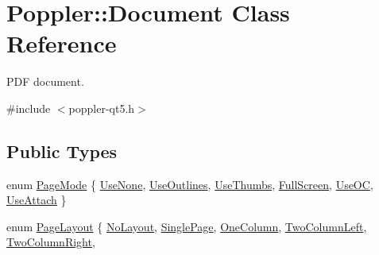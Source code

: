 \hypertarget{class_poppler_1_1_document}{}\section{Poppler\+:\+:Document Class Reference}
\label{class_poppler_1_1_document}


P\+DF document.  




{\ttfamily \#include $<$poppler-\/qt5.\+h$>$}

\subsection*{Public Types}
\begin{DoxyCompactItemize}
\item 
enum \hyperlink{class_poppler_1_1_document_a7157091ddc85f62b02cfc35a08c4822b}{Page\+Mode} \{ \newline
\hyperlink{class_poppler_1_1_document_a7157091ddc85f62b02cfc35a08c4822ba4b709ee334e2c3ea2bd8df2680de501e}{Use\+None}, 
\hyperlink{class_poppler_1_1_document_a7157091ddc85f62b02cfc35a08c4822ba0a1bf7b447a3f36898f6c5b286f53b21}{Use\+Outlines}, 
\hyperlink{class_poppler_1_1_document_a7157091ddc85f62b02cfc35a08c4822ba5984e71380eaffa41b4a90bb9c4a965b}{Use\+Thumbs}, 
\hyperlink{class_poppler_1_1_document_a7157091ddc85f62b02cfc35a08c4822ba942ce16a97060ae7ebe6513d9a860cd7}{Full\+Screen}, 
\newline
\hyperlink{class_poppler_1_1_document_a7157091ddc85f62b02cfc35a08c4822bae61492f6fb35469e734e8f41a292c4e9}{Use\+OC}, 
\hyperlink{class_poppler_1_1_document_a7157091ddc85f62b02cfc35a08c4822ba382b116328e14edd5929cfcc28c69f04}{Use\+Attach}
 \}
\item 
enum \hyperlink{class_poppler_1_1_document_a27b1574f15e09ae08b7acf7cc98f3fbd}{Page\+Layout} \{ \newline
\hyperlink{class_poppler_1_1_document_a27b1574f15e09ae08b7acf7cc98f3fbda711c5286c04de74232bc6a2ca4a4a05d}{No\+Layout}, 
\hyperlink{class_poppler_1_1_document_a27b1574f15e09ae08b7acf7cc98f3fbda6b412a622f9456f7b8d08d0d120229a1}{Single\+Page}, 
\hyperlink{class_poppler_1_1_document_a27b1574f15e09ae08b7acf7cc98f3fbdab1c3ce0dc45101db622b30a7e36f7e1b}{One\+Column}, 
\hyperlink{class_poppler_1_1_document_a27b1574f15e09ae08b7acf7cc98f3fbda35e0e5c15423834c6515cf2df64cdd12}{Two\+Column\+Left}, 
\newline
\hyperlink{class_poppler_1_1_document_a27b1574f15e09ae08b7acf7cc98f3fbdaa0759d4fea75041b18268728d7fff3ce}{Two\+Column\+Right}, 

\end{DoxyCompactItemize}
